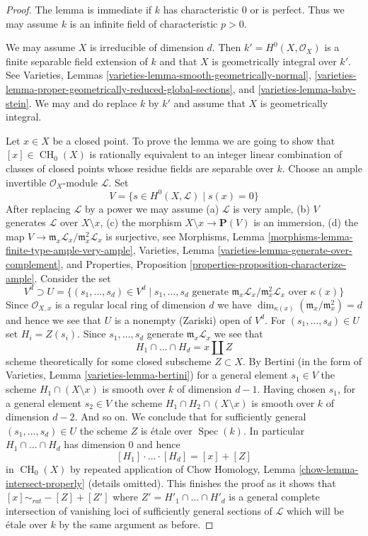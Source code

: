 \documentclass{stacks-project}
\theoremstyle{plain}
\theoremstyle{definition}
\theoremstyle{remark}
\numberwithin{equation}{subsection}
\def\Spec{\mathop{\mathrm{Spec}}}
\def\CH{\mathop{\mathrm{CH}}\nolimits}
\begin{document}
\begin{proof}
The lemma is immediate if $k$ has characteristic $0$ or is perfect.
Thus we may assume $k$ is an infinite field of characteristic $p > 0$.

\medskip\noindent
We may assume $X$ is irreducible of dimension $d$.
Then $k' = H^0(X, \mathcal{O}_X)$ is a finite separable field
extension of $k$ and that $X$ is geometrically integral over $k'$.
See Varieties, Lemmas \ref{varieties-lemma-smooth-geometrically-normal},
\ref{varieties-lemma-proper-geometrically-reduced-global-sections}, and
\ref{varieties-lemma-baby-stein}. We may and do replace $k$ by $k'$
and assume that $X$ is geometrically integral.

\medskip\noindent
Let $x \in X$ be a closed point. To prove the lemma we are going to show that
$[x] \in \CH_0(X)$ is rationally equivalent to an integer linear
combination of classes of closed points whose residue fields
are separable over $k$. Choose an ample invertible
$\mathcal{O}_X$-module $\mathcal{L}$. Set
$$
V = \{s \in H^0(X, \mathcal{L}) \mid s(x) = 0 \}
$$
After replacing $\mathcal{L}$ by a power we may assume
(a) $\mathcal{L}$ is very ample, (b) $V$ generates
$\mathcal{L}$ over $X \setminus x$, (c) the morphism
$X \setminus x \to \mathbf{P}(V)$ is an immersion, (d)
the map $V \to \mathfrak m_x\mathcal{L}_x/\mathfrak m_x^2\mathcal{L}_x$
is surjective, see
Morphisms, Lemma \ref{morphisms-lemma-finite-type-ample-very-ample},
Varieties, Lemma \ref{varieties-lemma-generate-over-complement}, and
Properties, Proposition \ref{properties-proposition-characterize-ample}.
Consider the set
$$
V^d \supset U =
\{
(s_1, \ldots, s_d) \in V^d \mid s_1, \ldots, s_d
\text{ generate }
\mathfrak m_x\mathcal{L}_x/\mathfrak m_x^2\mathcal{L}_x
\text{ over }\kappa(x)
\}
$$
Since $\mathcal{O}_{X, x}$ is a regular local ring of dimension $d$
we have $\dim_{\kappa(x)}(\mathfrak m_x/\mathfrak m_x^2) = d$
and hence we see that $U$ is a nonempty (Zariski) open of $V^d$.
For $(s_1, \ldots, s_d) \in U$ set $H_i = Z(s_i)$. Since
$s_1, \ldots, s_d$ generate $\mathfrak m_x\mathcal{L}_x$
we see that
$$
H_1 \cap \ldots \cap H_d = x \amalg Z
$$
scheme theoretically for some closed subscheme $Z \subset X$.
By Bertini (in the form of Varieties, Lemma \ref{varieties-lemma-bertini})
for a general element $s_1 \in V$ the scheme $H_1 \cap (X \setminus x)$
is smooth over $k$ of dimension $d - 1$.
Having chosen $s_1$, for a general element
$s_2 \in V$ the scheme $H_1 \cap H_2 \cap (X \setminus x)$
is smooth over $k$ of dimension $d - 2$. And so on.
We conclude that for sufficiently general
$(s_1, \ldots, s_d) \in U$ the scheme $Z$ is \'etale over $\Spec(k)$.
In particular $H_1 \cap \ldots \cap H_d$ has dimension $0$
and hence
$$
[H_1] \cdot \ldots \cdot [H_d] = [x] + [Z]
$$
in $\CH_0(X)$ by repeated application of
Chow Homology, Lemma \ref{chow-lemma-intersect-properly} (details omitted).
This finishes the proof as it shows that $[x] \sim_{rat} - [Z] + [Z']$
where $Z' = H'_1 \cap \ldots \cap H'_d$ is a general complete
intersection of vanishing loci of sufficiently general sections
of $\mathcal{L}$ which will be \'etale over $k$ by the same argument
as before.
\end{proof}
\end{document}
